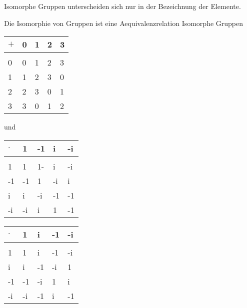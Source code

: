 Isomorphe Gruppen unterscheiden sich nur in der Bezeichnung der Elemente.

Die Isomorphie von Gruppen ist eine Aequivalenzrelation
Isomorphe Gruppen
\begin{multicols}{2}
\begin{tabular}{lllll}
  $+$ & 0 & 1 & 2 & 3 \\
  \hline\\
  0 & 0 & 1 & 2 & 3 \\
  1 & 1 & 2 & 3 & 0 \\
  2 & 2 & 3 & 0 & 1 \\
  3 & 3 & 0 & 1 & 2 \\
\end{tabular}
\columnbreak
und
\begin{tabular}{lllll}
  $\cdot$ & 1 & -1 & i & -i \\
  \hline\\
  1 & 1 & 1- & i & -i \\
  -1 & -1 & 1 & -i & i \\
  i & i & -i & -1 & -1 \\
  -i & -i & i & 1 & -1 \\
\end{tabular}
\end{multicols}
\begin{tabular}{lllll}
  $\cdot$ & 1 & i & -1 & -i \\
  \hline\\
  1 & 1 & i & -1 & -i \\
  i & i & -1 & -i & 1 \\
  -1 & -1 & -i & 1 & i \\
  -i & -i & -1 & i & -1 \\
\end{tabular}

